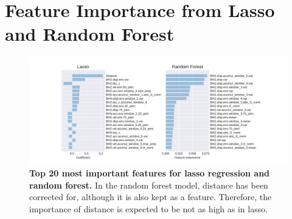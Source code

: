 \documentclass{article} %
\begin{document}


\newpage
\appendix

\section{Feature Importance from Lasso and Random Forest}
\begin{figure}[ht!]
	\centering
	\includegraphics*[scale=0.5, viewport= 12mm 0mm 500mm 120mm, angle=0]{./figure/Feature_importance_lasso_RF.pdf}
	\caption{{\bf Top 20 most important features for lasso regression and random forest.} In the random forest model, distance has been corrected for, although it is also kept as a feature. Therefore, the importance of distance is expected to be not as high as in lasso.}\label{Feature_importance_lasso_RF} 
\end{figure}



\end{document}
